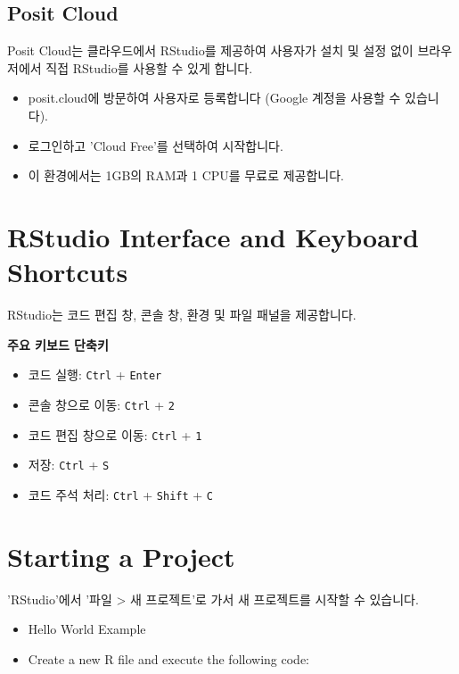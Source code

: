 \documentclass[
  a4paper,
]{book}
\providecommand{\tightlist}{%
  \setlength{\itemsep}{0pt}\setlength{\parskip}{0pt}}\usepackage{longtable,booktabs,array}
\begin{document}
\hypertarget{posit-cloud}{%
\subsection{Posit Cloud}\label{posit-cloud}}

Posit Cloud는 클라우드에서 RStudio를 제공하여 사용자가 설치 및 설정 없이
브라우저에서 직접 RStudio를 사용할 수 있게 합니다.

\begin{itemize}
\tightlist
\item
  posit.cloud에 방문하여 사용자로 등록합니다 (Google 계정을 사용할 수
  있습니다).
\item
  로그인하고 'Cloud Free'를 선택하여 시작합니다.
\item
  이 환경에서는 1GB의 RAM과 1 CPU를 무료로 제공합니다.
\end{itemize}

\hypertarget{rstudio-interface-and-keyboard-shortcuts}{%
\section{RStudio Interface and Keyboard
Shortcuts}\label{rstudio-interface-and-keyboard-shortcuts}}

RStudio는 코드 편집 창, 콘솔 창, 환경 및 파일 패널을 제공합니다.

\textbf{주요 키보드 단축키}

\begin{itemize}
\tightlist
\item
  코드 실행: \texttt{Ctrl} + \texttt{Enter}
\item
  콘솔 창으로 이동: \texttt{Ctrl} + \texttt{2}
\item
  코드 편집 창으로 이동: \texttt{Ctrl} + \texttt{1}
\item
  저장: \texttt{Ctrl} + \texttt{S}
\item
  코드 주석 처리: \texttt{Ctrl} + \texttt{Shift} + \texttt{C}
\end{itemize}

\hypertarget{starting-a-project}{%
\section{Starting a Project}\label{starting-a-project}}

'RStudio'에서 '파일 \textgreater{} 새 프로젝트'로 가서 새 프로젝트를
시작할 수 있습니다.

\begin{itemize}
\tightlist
\item
  Hello World Example
\item
  Create a new R file and execute the following code:
\end{itemize}
\end{document}
